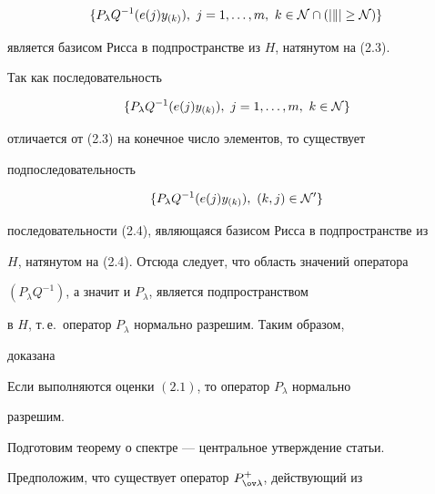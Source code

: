 \begin{equation} 


\{P_\lambda Q^{-1}(e(j)y_{(k)}),\ j=1,\dotsc,m, 


\ k\in\cal N\cap(|k|\ge N)\} 


\end{equation} 


является базисом Рисса в подпространстве из $H$, натянутом на (2.3). 


Так как последовательность 


\begin{equation} 


\{P_\lambda Q^{-1}(e(j)y_{(k)}),\ j=1,\dotsc,m, 


\ k\in\cal N\} 


\end{equation} 


отличается от (2.3) на конечное число элементов, то существует 


подпоследовательность 


\begin{equation} 


\{P_\lambda Q^{-1}(e(j)y_{(k)}),\ (k,j)\in\cal N'\} 


\end{equation} 


последовательности (2.4), являющаяся базисом Рисса в подпространстве из 


$H$, натянутом на (2.4). Отсюда следует, что область значений оператора 


$(P_\lambda Q^{-1})$, а значит и $P_\lambda$, является подпространством 


в $H$, т.\,е.~оператор $P_\lambda$ нормально разрешим. Таким образом, 


доказана 


 


\begin{thms} 


Если выполняются оценки $(2.1)$, то оператор $P_\lambda$ нормально 


разрешим. 


\end{thms} 


 


Подготовим теорему о спектре --- центральное утверждение статьи. 


Предположим, что существует оператор $P^+_{\ov\lambda}$, действующий из 


